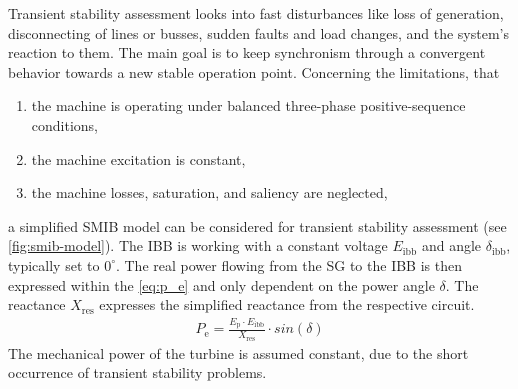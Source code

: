 Transient stability assessment looks into fast disturbances like loss of generation, disconnecting of lines or busses, sudden faults and load changes, and the system's reaction to them. The main goal is to keep synchronism through a convergent behavior towards a new stable operation point. Concerning the limitations, that
\begin{enumerate}
        \item the machine is operating under balanced three-phase positive-sequence conditions,
        \item the machine excitation is constant,
        \item the machine losses, saturation, and saliency are neglected,
\end{enumerate}
a simplified \acf{SMIB} model can be considered for transient stability assessment (see \autoref{fig:smib-model}).  The \ac{IBB} is working with a constant voltage $E_\mathrm{ibb}$ and angle $\delta_\mathrm{ibb}$, typically set to $0^\circ$. The real power flowing from the \ac{SG} to the \ac{IBB} is then expressed within the \autoref{eq:p_e} and only dependent on the power angle $\delta$. The reactance $X_\mathrm{res}$ expresses the simplified reactance from the respective circuit.
\begin{align}
        P_\mathrm{e}=\frac{E_\mathrm{p} \cdot E_\mathrm{ibb}}{X_\mathrm{res}} \cdot sin(\delta) \label{eq:p_e}
\end{align}
The mechanical power of the turbine is assumed constant, due to the short occurrence of transient stability problems.

